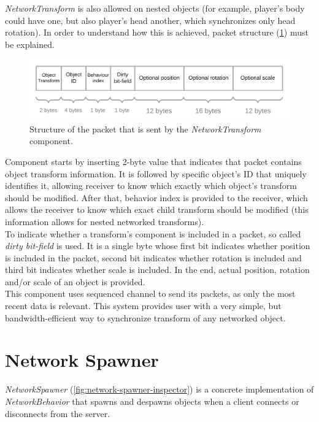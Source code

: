 \documentclass[times, utf8, diplomski]{fer}
\begin{document}
\textit{NetworkTransform} is also allowed on nested objects (for example, player's body could have one, but also player's head another, which synchronizes only head rotation). In order to understand how this is achieved, packet structure (\ref{fig:network-transform-packet-structure}) must be explained.

\begin{figure}[H]
	\centering
	\includegraphics[scale=0.25]{NetworkTransform-packet-structure}
	\caption{Structure of the packet that is sent by the \textit{NetworkTransform} component.}
	\label{fig:network-transform-packet-structure}
\end{figure}

Component starts by inserting 2-byte value that indicates that packet contains object transform information. It is followed by specific object's ID that uniquely identifies it, allowing receiver to know which exactly which object's transform should be modified. After that, behavior index is provided to the receiver, which allows the receiver to know which exact child transform should be modified (this information allows for nested networked transforms).\\

To indicate whether a transform's component is included in a packet, so called \textit{dirty bit-field} is used. It is a single byte whose first bit indicates whether position is included in the packet, second bit indicates whether rotation is included and third bit indicates whether scale is included. In the end, actual position, rotation and/or scale of an object is provided.\\

This component uses sequenced channel to send its packets, as only the most recent data is relevant. This system provides user with a very simple, but bandwidth-efficient way to synchronize transform of any networked object. 

\section{Network Spawner}
\textit{NetworkSpawner} (\ref{fig:network-spawner-inspector}) is a concrete implementation of \textit{NetworkBehavior} that spawns and despawns objects when a client connects or disconnects from the server.
\end{document}
